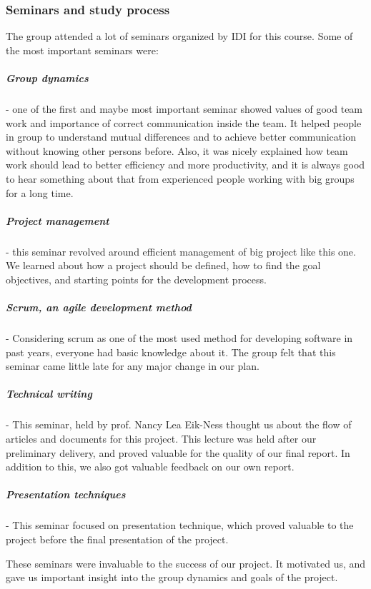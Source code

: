 	\subsubsection{Seminars and study process}
  The group attended a lot of seminars organized by IDI for this course. Some of
  the most important seminars were:
	
  \subparagraph{Group dynamics} - one of the first and maybe most important
  seminar showed values of good team work and importance of correct
  communication inside the team. It helped people in group to understand mutual
  differences and to achieve better communication without knowing other persons
  before. Also, it was nicely explained how team work should lead to better
  efficiency and more productivity, and it is always good to hear something
  about that from experienced people working with big groups for a long time.

  \subparagraph{Project management} - this seminar revolved around efficient
  management of big project like this one. We learned about how a project should
  be defined, how to find the goal objectives, and starting points for the
  development process. 
  
   \subparagraph{Scrum, an agile development method} - Considering scrum as one
   of the most used method for developing software in past years, everyone had
   basic knowledge about it.  The group felt that this seminar came little late
   for any major change in our plan.  

  \subparagraph{Technical writing} - This seminar, held by prof. Nancy Lea
  Eik-Ness thought us about the flow of articles and documents for this project.
  This lecture was held after our preliminary delivery, and proved valuable for
  the quality of our final report. In addition to this, we also got valuable
  feedback on our own report.

  \subparagraph{Presentation techniques} - This seminar focused on presentation
  technique, which proved valuable to the project before the final presentation
  of the project.

  These seminars were invaluable to the success of our project. It motivated us,
  and gave us important insight into the group dynamics and goals of the
  project.

